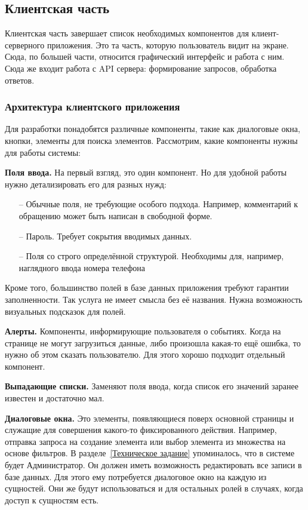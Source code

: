 \documentclass[a4paper,article]{article}
\begin{document}
\begin{sloppypar}
    \newpage

    \subsection{Клиентская часть}

    Клиентская часть завершает список необходимых компонентов для клиент-серверного приложения. Это та часть, которую пользователь видит на экране. Сюда, по большей части, относится графический интерфейс и работа с ним. Сюда же входит работа с API сервера: формирование запросов, обработка ответов.

    \subsubsection{Архитектура клиентского приложения}

    Для разработки понадобятся различные компоненты, такие как диалоговые окна, кнопки, элементы для поиска элементов. Рассмотрим, какие компоненты нужны для работы системы:

    \textbf{Поля ввода.} На первый взгляд, это один компонент. Но для удобной работы нужно детализировать его для разных нужд:

    \begin{itemize}[nolistsep]
        \item[--] Обычные поля, не требующие особого подхода. Например, комментарий к обращению может быть написан в свободной форме.
        \item[--] Пароль. Требует сокрытия вводимых данных.
        \item[--] Поля со строго определённой структурой. Необходимы для, например, наглядного ввода номера телефона
    \end{itemize}

    Кроме того, большинство полей в базе данных приложения требуют гарантии заполненности. Так услуга не имеет смысла без её названия. Нужна возможность визуальных подсказок для полей.

    \textbf{Алерты.} Компоненты, информирующие пользователя о событиях. Когда на странице не могут загрузиться данные, либо произошла какая-то ещё ошибка, то нужно об этом сказать пользователю. Для этого хорошо подходит отдельный компонент.

    \textbf{Выпадающие списки.} Заменяют поля ввода, когда список его значений заранее известен и достаточно мал.

    \textbf{Диалоговые окна.} Это элементы, появляющиеся поверх основной страницы и служащие для совершения какого-то фиксированного действия. Например, отправка запроса на создание элемента или выбор элемента из множества на основе фильтров. В разделе~\ref{Техническое задание} упоминалось, что в системе будет Администратор. Он должен иметь возможность редактировать все записи в базе данных. Для этого ему потребуется диалоговое окно на каждую из сущностей. Они же будут использоваться и для остальных ролей в случаях, когда доступ к сущностям есть.


\end{sloppypar}
\end{document}
